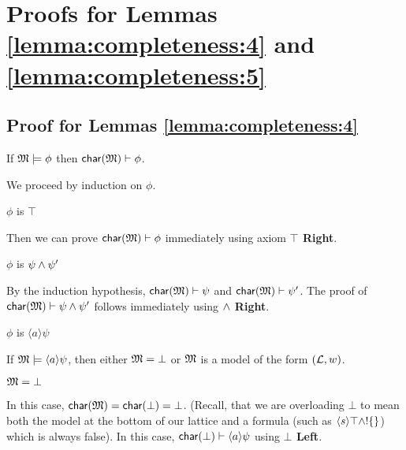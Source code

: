 \section{Proofs for Lemmas \ref{lemma:completeness:4} and \ref{lemma:completeness:5}}\label{app:completeness:proofs}

\subsection{Proof for Lemmas \ref{lemma:completeness:4}}
If $\frak{M}\models \phi$ then $\mathsf{char}(\frak{M}) \vdash \phi$.

\NI We proceed by induction on $\phi$.

\setcounter{mycase}{0}

\begin{mycase}
$\phi$ is $\top$
\end{mycase}
Then we can prove  $ \mathsf{char}(\frak{M}) \vdash \phi$ immediately using axiom {\bf $\top$ Right}.

\begin{mycase}
$\phi$ is $\psi \land \psi'$
\end{mycase}
By the induction hypothesis, $  \mathsf{char}(\frak{M}) \vdash \psi$ and $  \mathsf{char}(\frak{M}) \vdash \psi'$.
The proof of $  \mathsf{char}(\frak{M}) \vdash \psi \land \psi'$ follows immediately using {\bf $\land$ Right}.

\begin{mycase}
$\phi$ is $\langle a \rangle \psi$
\end{mycase}
If $\frak{M} \models \langle a \rangle \psi$, then either $\frak{M} = \bot$ or $\frak{M}$ is a  model of the form $(\mathcal{L},w)$.
\begin{subcase}
$\frak{M} = \bot$
\end{subcase}
In this case, $  \mathsf{char}(\frak{M}) =  \mathsf{char}(\bot) = \bot$. (Recall, that we are overloading $\bot$ to mean both the  model at the bottom of our lattice and a formula (such as $\langle s \rangle \top \land !\{\}$) which is always false).
In this case, $  \mathsf{char}(\bot) \vdash  \langle a \rangle \psi$ using {\bf $\bot$ Left}.


